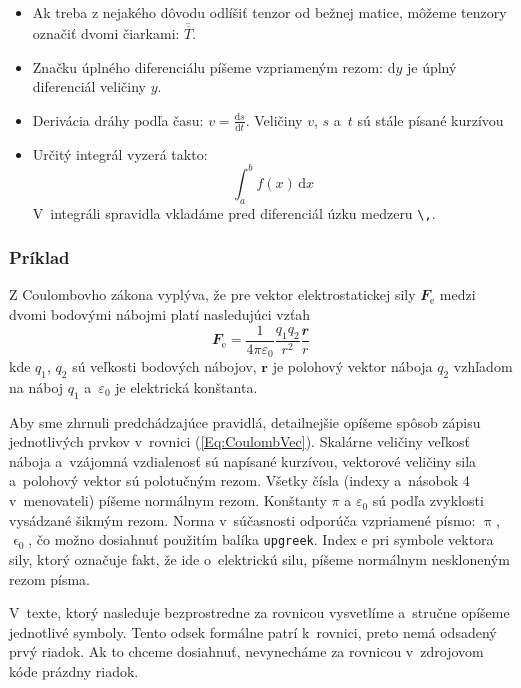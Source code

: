 \documentclass[../../../thesis.tex]{subfiles}
\begin{document}
\begin{itemize}
    \item Ak treba z nejakého dôvodu odlíšiť tenzor
    od bežnej matice, môžeme tenzory označiť dvomi čiarkami:
    $\overline{\overline T}$.

    \item Značku úplného diferenciálu píšeme vzpriameným rezom:
    $\mathrm dy$ je úplný diferenciál veličiny $y$.

    \item Derivácia dráhy podľa času:
    $v = \frac{\mathrm ds}{\mathrm dt}$.
    Veličiny $v$, $s$ a~$t$ sú stále písané kurzívou

    \item Určitý integrál vyzerá takto:
    $$
    \int_a^b f(x)\,\mathrm dx
    $$
    V~integráli spravidla vkladáme pred diferenciál
    úzku medzeru \verb|\,|.
\end{itemize}

\subsubsection*{\normalsize Príklad}
Z Coulombovho zákona vyplýva,
že pre vektor elektrostatickej sily $\mathbfit F_\mathrm e$
medzi dvomi bodovými nábojmi platí nasledujúci vzťah
\begin{equation}\label{Eq:CoulombVec}
  \mathbfit F_\mathrm e = \frac1{4\pi\varepsilon_0}
  \frac{q_1q_2}{r^2}\frac{\mathbfit r}r
\end{equation}
kde $q_1$, $q_2$ sú veľkosti bodových nábojov,
$\mathbf r$ je polohový vektor náboja $q_2$
vzhľadom na náboj $q_1$
a~$\varepsilon_0$ je elektrická konštanta.

Aby sme zhrnuli predchádzajúce pravidlá, detailnejšie opíšeme spôsob zápisu jednotlivých prvkov
v~rovnici (\ref{Eq:CoulombVec}).
Skalárne veličiny veľkosť náboja a~vzájomná vzdialenosť sú
napísané kurzívou,
vektorové veličiny sila a~polohový vektor sú polotučným rezom.
Všetky čísla (indexy a~násobok 4 v~menovateli)
píšeme normálnym rezom.
Konštanty $\pi$ a $\varepsilon_0$ sú podľa zvyklosti vysádzané
šikmým rezom.
Norma v~súčasnosti odporúča vzpriamené písmo:
$\uppi$, $\upvarepsilon_0$, čo možno dosiahnuť použitím balíka
\verb|upgreek|.
Index $\mathrm e$ pri symbole vektora sily,
ktorý označuje fakt, že ide o~elektrickú silu,
píšeme normálnym neskloneným rezom písma.

V~texte, ktorý nasleduje bezprostredne za rovnicou vysvetlíme
a~stručne opíšeme jednotlivé symboly.
Tento odsek formálne patrí k~rovnici,
preto nemá odsadený prvý riadok.
Ak to chceme dosiahnuť,
nevynecháme za rovnicou v~zdrojovom kóde
prázdny riadok.
\end{document}
